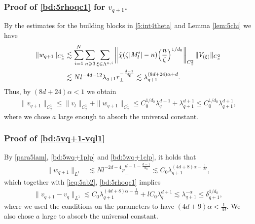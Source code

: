 \documentclass[10pt,a4paper]{amsart}
\numberwithin{equation}{section}
\def\({{\Big(}}
\def\){{\Big)}}
\newcommand{\norm}[1]{\left\|#1\right\|}
\def\geq{\geqslant}
\def\leq{\leqslant}
\def\({{\Big(}}
\def\){{\Big)}}
\def\geq{\geqslant}
\def\leq{\leqslant}
\begin{document}
\subsubsection{Proof of  \eqref{bd:5rhoqc1} for $v_{q+1}$.}
 By the estimates for the building blocks in \eqref{5:int4theta} and   Lemma \ref{lem:5chi} we have 
\begin{align}
\|w_{q+1}\|_{C_{x}^1}&\lesssim \sum_{i=1}^N\sum_{n\geq3}\sum_{\xi\in\Lambda^{n,i}}\norm{\tilde{\chi}(\zeta |M^i_l|-n)\(\frac{n}{\zeta }\)^{1/d_0}}_{C_{x}^{2}}\|  V_{ (\xi)}\|_{C_{x}^2}\notag\\
&\lesssim  Nl^{-4d-12}\lambda_{q+1} r_\perp^{-\frac{d-1}{d_0}}\lesssim \lambda_{q+1}^{(8d+24)\alpha+d }.\notag
\end{align}
 Thus, by $(8d+24)\alpha<1$ we obtain
 \begin{align*}
\|v_{q+1}\|_ {C_{x}^1}\leq\|v_{l}\|_ {C_{x}^1}+\|w_{q+1}\|_ {C_{x}^1}\leq C_0^{1/d_0}\lambda_{q}^{d+1}+ \lambda_{q+1}^{d+1}\leq C_0^{1/d_0}\lambda_{q+1}^{ d+1},
 \end{align*} where we chose $a$ large enough to absorb the universal constant. 

\subsubsection{Proof of \eqref{bd:5vq+1-vql1}}By \eqref{para5lam}, \eqref{bd:5wq+1plp} and \eqref{bd:5wq+1clp}, it holds that
\begin{align*}
\|w_{q+1}\|_{L^1}&\lesssim  Nl^{-2d-4}r_\perp^{{d-1}-\frac{d-1}{d_0}} \lesssim C_0\lambda_{q+1}^{(4d+8)\alpha-\frac{1}{M}},
\end{align*} 
which together with   \eqref{ieq:5ab2}, \eqref{bd:5rhoqc1} implies 
\begin{align*}
     \|v_{q+1}-v_{q}\|_{L^{1}}\lesssim
 C_0\lambda_{q+1}^{(4d+8)\alpha-\frac{1}{M}}+lC_0\lambda_q^{d+1}\lesssim \lambda_{q+1}^{-\alpha}\leq  \delta_{q+1}^{1/d_0},
\end{align*}
where we used the   conditions on the parameters to have $(4d+9)\alpha<\frac{1}{M} $. We also chose $a$ large to absorb the universal constant.
\end{document}
